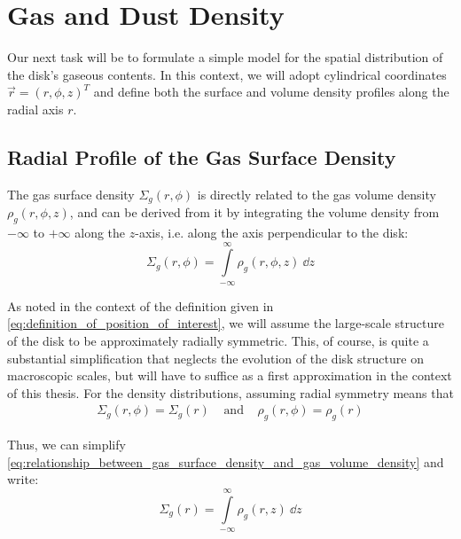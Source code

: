         
\clearpage\section{Gas and Dust Density}
\label{sec:gas_and_dust_density_profiles}

    Our next task will be to formulate a simple model for the spatial distribution of the disk's 
    gaseous contents. In this context, we will adopt cylindrical coordinates 
    $\vec r=(r, \phi, z)^T$ and define both the surface and volume density profiles along the 
    radial axis $r$.

    \subsection{Radial Profile of the Gas Surface Density}

        The gas surface density $\Sigma_g(r,\phi)$ is directly related to the gas volume density
        $\rho_g(r,\phi,z)$, and can be derived from it by integrating the volume density from 
        $-\infty$ to $+\infty$ along the $z$-axis, i.e. along the axis perpendicular to the disk:
        \begin{equation}
            \label{eq:relationship_between_gas_surface_density_and_gas_volume_density}
            \Sigma_g(r,\phi)
                = \int\limits_{-\infty}^{\infty} \rho_g(r,\phi,z)\ \dd z
        \end{equation}

        As noted in the context of the definition given in 
        \cref{eq:definition_of_position_of_interest},
        we will assume the large-scale structure of the disk to be approximately radially symmetric.
        This, of course, is quite a substantial simplification 
        that neglects the evolution of the disk structure on macroscopic scales,
        but will have to suffice as a first approximation in the context of this thesis.
        For the density distributions, assuming radial symmetry means that
        \begin{align}
            \Sigma_g(r, \phi) = \Sigma_g(r) 
            \ \ \ \ \ \text{and}\ \ \ \ \
            \rho_g(r, \phi) = \rho_g(r)
        \end{align}

        Thus, we can simplify 
        \cref{eq:relationship_between_gas_surface_density_and_gas_volume_density} and write:
        \begin{equation}
            \Sigma_g(r) = \int\limits_{-\infty}^{\infty} \rho_g(r,z)\ \dd z
        \end{equation}

